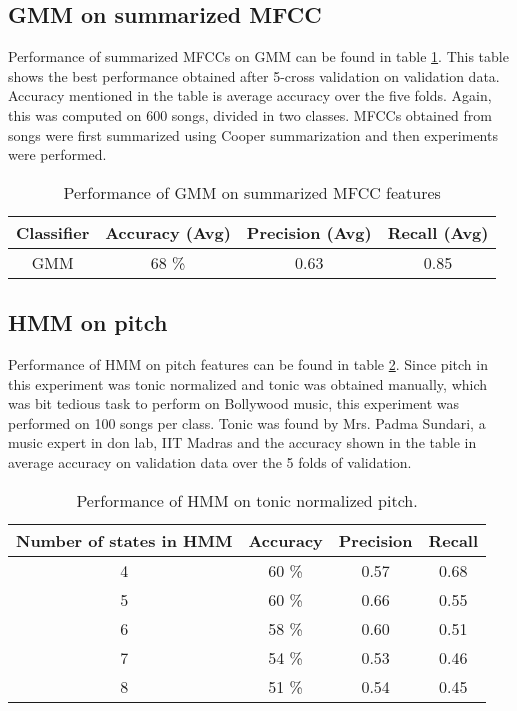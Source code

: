 \subsection{GMM on summarized MFCC} Performance of summarized MFCCs on GMM can be found in table \ref{tab:mfcc}. This table shows the best performance obtained after 5-cross validation on validation data. Accuracy mentioned in the table is average accuracy over the five folds. Again, this was computed on 600 songs, divided in two classes. MFCCs obtained from songs were first summarized using Cooper summarization and then experiments were performed. 
\begin{table}[!htbp]

\begin{center}
\begin{tabular}{ |c|c|c|c| } 
 \hline
 Classifier & Accuracy (Avg) & Precision (Avg) & Recall (Avg) \\ \hline
 GMM   & 68 \%  & 0.63 & 0.85\\ 
  \hline
\end{tabular}
\end{center}
\caption{Performance of GMM on summarized MFCC features}
\label{tab:mfcc}
\end{table}
\subsection{HMM on pitch} Performance of HMM on pitch features can be found in table \ref{tab:pitch}. Since pitch in this experiment was tonic normalized and tonic was obtained manually, which was bit tedious task to perform on Bollywood music, this experiment was performed on 100 songs per class. Tonic was found by Mrs. Padma Sundari, a music expert in don lab, IIT Madras and the accuracy shown in the table in average accuracy on validation data over the 5 folds of validation.
\begin{table}[!htbp]
\begin{center}
\begin{tabular}{ |c|c|c|c| } 
 \hline
 Number of states in HMM & Accuracy & Precision & Recall  \\ \hline
 4 & 60 \% & 0.57 & 0.68 \\ 
 5 & 60 \% & 0.66 & 0.55 \\
 6 & 58 \% & 0.60 & 0.51 \\ 
 7 & 54 \% & 0.53 & 0.46 \\ 
 8 & 51 \% & 0.54 & 0.45\\
 
 \hline
\end{tabular}
\end{center}
\caption{Performance of HMM on tonic normalized pitch. }\label{tab:pitch}
\end{table}
